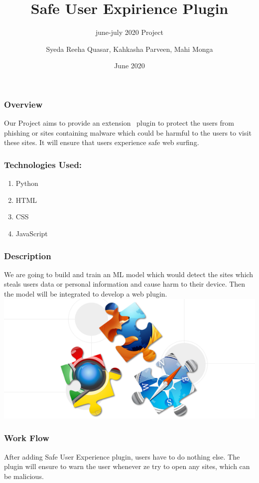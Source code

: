 \documentclass[14pt]{beamer}
\title[SUE]{Safe User Expirience Plugin}
\subtitle{june-july 2020 Project}
\author[Team 36]{Syeda Reeha Quasar, Kahkasha Parveen, Mahi Monga}
\date{June 2020}
\begin{document}
\begin{frame}
    \titlepage
\end{frame}

\begin{frame}
    \frametitle{Overview}
    Our Project aims to provide an extension \ plugin to protect the users from phishing or sites containing malware which could be harmful to the users to visit these sites. It will ensure that users experience safe web surfing.
\end{frame}

\begin{frame}
    \frametitle{Technologies Used:}
    \begin{enumerate}
        \item{Python}
        \item{HTML}
        \item{CSS}
        \item{JavaScript}
    \end{enumerate}
\end{frame}

\begin{frame}
    \frametitle{Description}
    We are going to build and train an ML model which would detect the sites which steals users data or personal information and cause harm to their device.
    Then the model will be integrated to develop a web plugin.
    \includegraphics{imag}
    \href{https://developer.chrome.com/extensions/getstarted}{}
\end{frame}

\begin{frame}
    \frametitle{Work Flow}
    After adding Safe User Experience plugin, users have to do nothing else. The plugin will ensure to warn the user whenever ze try to open any sites, which can be malicious.
\end{frame}
\end{document}
